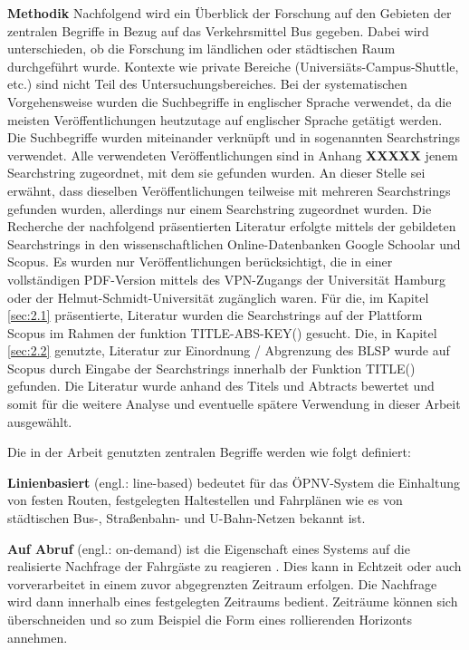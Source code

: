 \textbf{Methodik} Nachfolgend wird ein Überblick der Forschung auf den Gebieten der zentralen Begriffe in Bezug auf das Verkehrsmittel Bus gegeben. Dabei wird unterschieden, ob die Forschung im ländlichen oder städtischen Raum durchgeführt wurde. Kontexte wie private Bereiche (Universiäts-Campus-Shuttle, etc.) sind nicht Teil des Untersuchungsbereiches. Bei der systematischen Vorgehensweise wurden die Suchbegriffe in englischer Sprache verwendet, da die meisten Veröffentlichungen heutzutage auf englischer Sprache getätigt werden. Die Suchbegriffe wurden miteinander verknüpft und in sogenannten Searchstrings verwendet. Alle verwendeten Veröffentlichungen sind in Anhang \textbf{XXXXX} jenem Searchstring zugeordnet, mit dem sie gefunden wurden. An dieser Stelle sei erwähnt, dass dieselben Veröffentlichungen teilweise mit mehreren Searchstrings gefunden wurden, allerdings nur einem Searchstring zugeordnet wurden. Die Recherche der nachfolgend präsentierten Literatur erfolgte mittels der gebildeten Searchstrings in den wissenschaftlichen Online-Datenbanken Google Schoolar und Scopus. Es wurden nur Veröffentlichungen berücksichtigt, die in einer vollständigen PDF-Version mittels des VPN-Zugangs der Universität Hamburg oder der Helmut-Schmidt-Universität zugänglich waren. Für die, im Kapitel \ref{sec:2.1} präsentierte, Literatur wurden die Searchstrings auf der Plattform Scopus im Rahmen der funktion \glqq TITLE-ABS-KEY()\grqq{} gesucht. Die, in Kapitel \ref{sec:2.2} genutzte, Literatur zur Einordnung / Abgrenzung des BLSP wurde auf Scopus durch Eingabe der Searchstrings innerhalb der Funktion \glqq TITLE()\grqq{} gefunden. Die Literatur wurde anhand des Titels und Abtracts bewertet und somit für die weitere Analyse und eventuelle spätere Verwendung in dieser Arbeit ausgewählt. 

Die in der Arbeit genutzten zentralen Begriffe werden wie folgt definiert:

\textbf{Linienbasiert} (engl.: line-based) bedeutet für das ÖPNV-System die Einhaltung von festen Routen, festgelegten Haltestellen und Fahrplänen wie es von städtischen Bus-, Straßenbahn- und U-Bahn-Netzen bekannt ist.

\textbf{Auf Abruf} (engl.: on-demand) ist die Eigenschaft eines Systems auf die realisierte Nachfrage der Fahrgäste zu reagieren \parencite[vgl.][S.3]{vansteenwegen_survey_2022}. Dies kann in Echtzeit oder auch vorverarbeitet in einem zuvor abgegrenzten Zeitraum erfolgen. Die Nachfrage wird dann innerhalb eines festgelegten Zeitraums bedient. Zeiträume können sich überschneiden und so zum Beispiel die Form eines rollierenden Horizonts annehmen.

